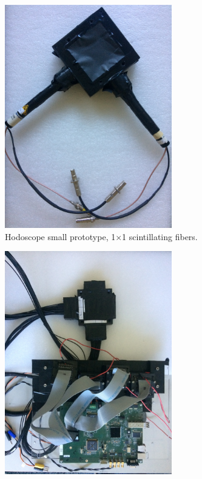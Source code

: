 \begin{figure}
\begin{subfigure}[t]{.5\textwidth}
\centering
\includegraphics[width=0.8\textwidth]{03_GraphicFiles/chapter3_CLaRySproto/Hodoscope/hodo2.jpg}
\caption{Hodoscope small prototype, 1$\times$1 scintillating fibers.}
\label{chap3::fig::singleFibHodo}
\end{subfigure}
\begin{subfigure}[t]{.5\textwidth}
\centering
\includegraphics[width=0.8\textwidth]{03_GraphicFiles/chapter3_CLaRySproto/Hodoscope/hodo32_withCard.jpg}

\end{subfigure}
\end{figure}

